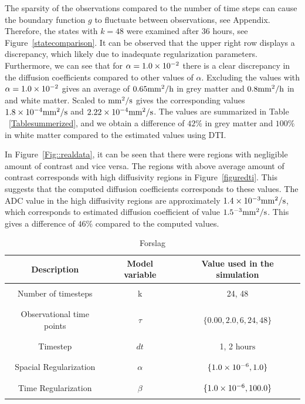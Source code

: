 \documentclass[12pt,a4paper]{article}
\begin{document}
The sparsity of the observations compared to the number of time steps can cause the boundary function $g$ to fluctuate between observations, see Appendix. Therefore, the states with $k=48$ were examined after 36 hours, see Figure~\ref{statecomparison}. It can be observed that the upper right row displays a discrepancy, which likely due to inadequate regularization parameters. Furthermore, we can see that for $\alpha=1.0\times 10\sp{-2}$ there is a clear discrepancy in the diffusion coefficients compared to other values of $\alpha$. Excluding the values with $\alpha=1.0\times 10\sp{-2}$ gives an average of $ 0.65 \mathrm{mm\sp{2}/h}$ in grey matter and $ 0.8 \mathrm{mm\sp{2}/h}$ in and white matter. Scaled to $\mathrm{mm\sp{2}/s}$ gives the corresponding values $1.8\times 10\sp{-4}\mathrm{mm\sp{2}/s}$ and $2.22\times 10\sp{-4} \mathrm{mm\sp{2}/s}$. The values are summarized in Table ~\ref{Tablesummerized}, and we obtain a difference of $42\%$ in grey matter and $ 100 \%$ in white matter compared to the estimated values using DTI.

In Figure~\ref{Fig::realdata}, it can be seen that there were regions with negligible amount of contrast and vice versa. The regions with above average amount of contrast corresponds with high diffusivity regions in Figure~\ref{figuredti}. This suggests that the computed diffusion coefficients corresponds to these values. The ADC value in the high diffusivity regions are approximately  $1.4\times 10\sp{-3} \mathrm{mm\sp{2}/s}$, which corresponds to estimated diffusion coefficient of value $1.5\time 10\sp{-3} \mathrm{mm\sp{2}/s}$. This gives a difference of $ 46 \%$ compared to the computed values.



\begin{table}\centering
\begin{tabular}{|ccc|}
\hline
Description & Model variable  & Value used in the simulation\\
\hline
& & \\
Number of timesteps &  k	 & 24, 48	\\
& & \\
\hline
& & \\
Observational time points  & $\tau$ &  $\lbrace 0.00,2.0, 6 , 24, 48 \rbrace$	 \\
& & \\
\hline
& & \\
Timestep & $dt$	 	   &	  1, 2 $\mathrm{hours}$	\\ 
& & \\
\hline
& & \\
Spacial Regularization & $\alpha$	   &	  $\lbrace 1.0\times10\sp{-6}, 1.0\rbrace$\\ 
& & \\
\hline
& & \\
Time Regularization   & $\beta$	   &	 $\lbrace 1.0\times10\sp{-6}, 100.0\rbrace$	\\ 
& & \\
\hline
\end{tabular}
\caption{Forslag}
\label{model-params-overview}
\end{table}
\end{document}
